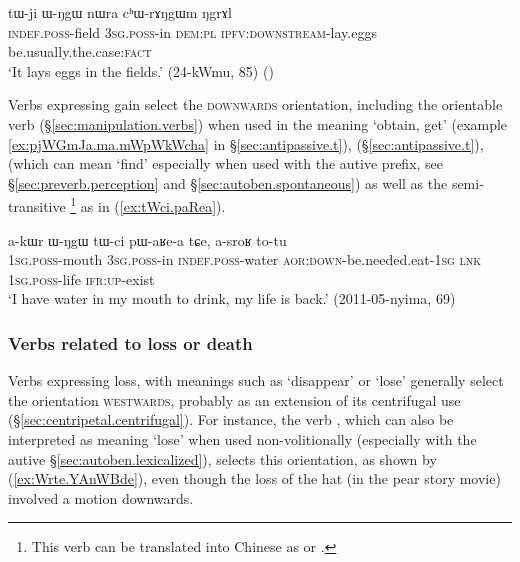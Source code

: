 \begin{exe}
\ex \label{ex:chWrANgWm}
\gll tɯ-ji ɯ-ŋgɯ nɯra cʰɯ-rɤŋgɯm ŋgrɤl \\
\textsc{indef}.\textsc{poss}-field \textsc{3sg}.\textsc{poss}-in \textsc{dem}:\textsc{pl} \textsc{ipfv}:\textsc{downstream}-lay.eggs be.usually.the.case:\textsc{fact} \\
\glt `It lays eggs in the fields.' (24-kWmu, 85) ()
\end{exe}

Verbs expressing gain select the \textsc{downwards} orientation, including the orientable verb  (§\ref{sec:manipulation.verbs}) when used in the meaning `obtain, get' (example \ref{ex:pjWGmJa.ma.mWpWkWcha} in §\ref{sec:antipassive.t}),  (§\ref{sec:antipassive.t}),  (which can mean `find' especially when used with the autive prefix, see §\ref{sec:preverb.perception} and §\ref{sec:autoben.spontaneous}) as well as the semi-transitive \footnote{This verb can be translated into Chinese as  or .} as in (\ref{ex:tWci.paRea}).
  
\begin{exe}
\ex \label{ex:tWci.paRea}
\gll a-kɯr ɯ-ŋgɯ tɯ-ci pɯ-aʁe-a tɕe, a-sroʁ to-tu  \\
\textsc{1sg}.\textsc{poss}-mouth \textsc{3sg}.\textsc{poss}-in \textsc{indef}.\textsc{poss}-water \textsc{aor}:\textsc{down}-be.needed.eat-\textsc{1sg} \textsc{lnk} \textsc{1sg}.\textsc{poss}-life \textsc{ifr}:\textsc{up}-exist \\
\glt `I have water in my mouth to drink, my life is back.' (2011-05-nyima, 69)
\end{exe} 

\subsubsection{Verbs related to loss or death} \label{sec:preverb.loss}
Verbs expressing loss, with meanings such as `disappear' or `lose' generally select the orientation \textsc{westwards}, probably as an extension of its centrifugal use (§\ref{sec:centripetal.centrifugal}). For instance, the verb , which can also be interpreted as meaning `lose' when used non-volitionally (especially with the autive §\ref{sec:autoben.lexicalized}), selects this orientation, as shown by (\ref{ex:Wrte.YAnWBde}), even though the loss of the hat (in the pear story movie) involved a motion downwards.
 
